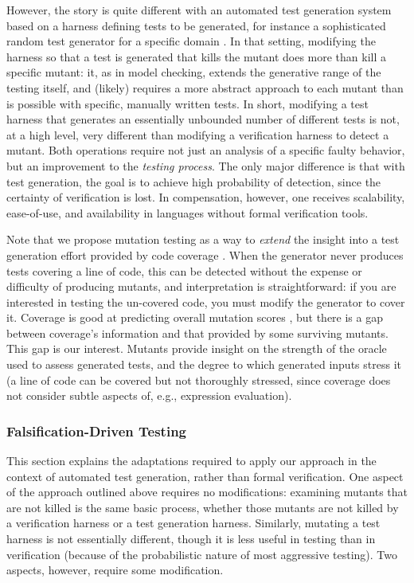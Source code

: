 \documentclass{svjour3}
\begin{document}
However, the story is quite different with an automated test
generation system based on a harness defining tests to be generated,
for instance a sophisticated random test generator for a specific
domain \cite{ICSEDiff,csmith,tstlsttt,rcutorture}.  In that setting,
modifying the harness so that a test is generated that kills the
mutant does more than kill a specific mutant:  it, as in model
checking, extends the generative range of the testing itself, and
(likely) requires a more abstract approach to each mutant than is
possible with specific, manually written tests.  In short, modifying a
test harness that generates an essentially unbounded number of
different tests is not, at a high level, very different than modifying
a verification harness to detect a mutant.  Both operations require
not just an analysis of a specific faulty behavior, but an improvement
to the \emph{testing process}.  The only major difference is that with
test generation, the goal is to achieve high probability of detection,
since the certainty of verification is lost.  In compensation,
however, one receives scalability, ease-of-use, and availability in
languages without formal verification tools.

Note that we propose mutation testing as a way to \emph{extend} the insight
into a test generation effort provided by code coverage \cite{CovDisc}.  When the
generator never produces tests covering a line of code, this can be
detected without the expense or difficulty of producing mutants, and
interpretation is straightforward:  if you are interested in testing
the un-covered code, you must modify the generator to cover it.
Coverage is good at predicting overall mutation scores \cite{ISSTA13,ICSE14},
but there is a gap between coverage's information and that provided by
some surviving mutants.  This gap is our interest.
Mutants provide insight on the strength of the oracle
used to assess generated tests, and the degree to which generated
inputs stress it (a line of code can be covered but not thoroughly
stressed, since coverage does not consider subtle aspects of, e.g.,
expression evaluation).

\subsubsection{Falsification-Driven Testing}

This section explains the
adaptations required to apply our approach in the context of automated
test generation, rather than formal verification.
One aspect of the approach outlined above requires no modifications:
examining mutants that are not killed is the same basic process,
whether those mutants are not killed by a verification harness or a
test generation harness.  Similarly, mutating a test harness is not essentially
different, though it is less useful in testing than in verification
(because of the probabilistic nature of most aggressive testing).  Two
aspects, however, require some modification.
\end{document}
